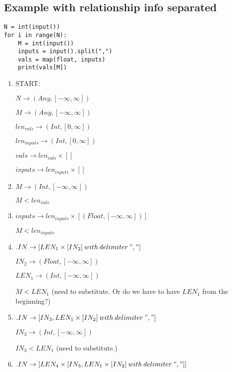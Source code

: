 \documentclass[11pt]{article}
\begin{document}
\subsection{Example with relationship info separated}

\begin{lstlisting}
N = int(input())
for i in range(N):
    M = int(input())
    inputs = input().split(",")
    vals = map(float, inputs)
    print(vals[M])
\end{lstlisting}

\begin{enumerate}
  \item START:
  
  $N \rightarrow (Any, [-\infty, \infty])$
  
  $M \rightarrow (Any, [-\infty, \infty])$
  
  $len_{vals} \rightarrow (Int, [0, \infty])$
  
  $len_{inputs} \rightarrow (Int, [0, \infty])$
  
  $vals \rightarrow len_{vals} \times []$
  
  $inputs \rightarrow len_{inputs} \times []$
  
  \item $M \rightarrow (Int, [-\infty, \infty])$
  
  $M < len_{vals}$
  
  \item $inputs \rightarrow len_{inputs} \times [(Float, [-\infty, \infty])]$
  
  $M < len_{inputs}$
  
  \item $.IN \rightarrow [LEN_1 \times [IN_2]\:with\:delimiter\:","]$
  
  $IN_2 \rightarrow (Float, [-\infty, \infty])$
  
  $LEN_1 \rightarrow (Int, [-\infty, \infty])$
  
  $M < LEN_1$ (need to substitute. Or do we have to have $LEN_1$ from the beginning?)
  
  \item $.IN \rightarrow [IN_3, LEN_1 \times [IN_2]\:with\:delimiter\:","]$
  
  $IN_3 \rightarrow (Int, [-\infty, \infty])$
  
  $IN_3 < LEN_1$ (need to substitute.)
  
  \item $.IN \rightarrow [LEN_4 \times [IN_3, LEN_1 \times [IN_2]\:with\:delimiter\:","]]$
  

\end{enumerate}
\end{document}
